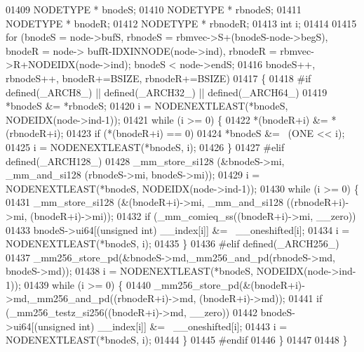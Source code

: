 \begin{DoxyCode}
{01409         NODETYPE * bnodeS;
01410         NODETYPE * rbnodeS;
01411         NODETYPE * bnodeR;
01412         NODETYPE * rbnodeR;
01413         \textcolor{keywordtype}{int} i;
01414 
01415         \textcolor{keywordflow}{for} (bnodeS = node->bufS, rbnodeS = rbmvec->S+(bnodeS-node->begS), bnodeR = node->
      bufR-IDXINNODE(node->ind), rbnodeR = rbmvec->R+NODEIDX(node->ind); bnodeS < node->endS;
01416                         bnodeS++, rbnodeS++, bnodeR+=BSIZE, rbnodeR+=BSIZE)
01417         \{
01418 \textcolor{preprocessor}{#if defined(\_ARCH8\_) || defined(\_ARCH32\_) || defined(\_ARCH64\_)}
01419                 *bnodeS &= *rbnodeS;
01420                 i = NODENEXTLEAST(*bnodeS, NODEIDX(node->ind-1));
01421                 \textcolor{keywordflow}{while} (i >= 0) \{
01422                         *(bnodeR+i) &= *(rbnodeR+i);
01423                         \textcolor{keywordflow}{if} (*(bnodeR+i) == 0)
01424                                 *bnodeS &= ~(ONE << i);
01425                         i = NODENEXTLEAST(*bnodeS, i);
01426                 \}
01427 \textcolor{preprocessor}{#elif defined(\_ARCH128\_)}
01428                 \_mm\_store\_si128 (&bnodeS->mi, \_mm\_and\_si128 (rbnodeS->mi, bnodeS->mi));
01429                 i = NODENEXTLEAST(*bnodeS, NODEIDX(node->ind-1));
01430                 \textcolor{keywordflow}{while} (i >= 0) \{
01431                         \_mm\_store\_si128 (&(bnodeR+i)->mi, \_mm\_and\_si128 ((rbnodeR+i)->mi, (bnodeR+i)->mi));
01432                         \textcolor{keywordflow}{if} (\_mm\_comieq\_ss((bnodeR+i)->mi, \_\_zero))
01433                                 bnodeS->ui64[(\textcolor{keywordtype}{unsigned} int) \_\_index[i]] &= ~\_\_oneshifted[i];
01434                         i = NODENEXTLEAST(*bnodeS, i);
01435                 \}
01436 \textcolor{preprocessor}{#elif defined(\_ARCH256\_)}
01437                 \_mm256\_store\_pd(&bnodeS->md,\_mm256\_and\_pd(rbnodeS->md, bnodeS->md));
01438                 i = NODENEXTLEAST(*bnodeS, NODEIDX(node->ind-1));
01439                 \textcolor{keywordflow}{while} (i >= 0) \{
01440                         \_mm256\_store\_pd(&(bnodeR+i)->md,\_mm256\_and\_pd((rbnodeR+i)->md, (bnodeR+i)->md));
01441                         \textcolor{keywordflow}{if} (\_mm256\_testz\_si256((bnodeR+i)->md, \_\_zero))
01442                                 bnodeS->ui64[(\textcolor{keywordtype}{unsigned} int) \_\_index[i]] &= ~\_\_oneshifted[i];
01443                         i = NODENEXTLEAST(*bnodeS, i);
01444                 \}
01445 \textcolor{preprocessor}{#endif}
01446         \}
01447 
01448 \}
}
\end{DoxyCode}
